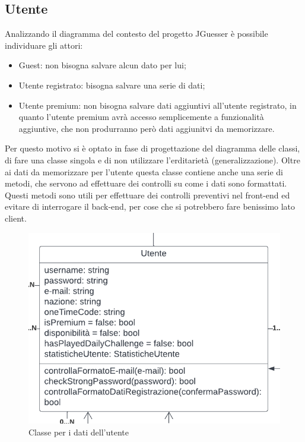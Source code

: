\subsection{Utente}
Analizzando il diagramma del contesto del progetto JGuesser è possibile individuare gli attori: 
\begin{itemize}
    \item Guest: non bisogna salvare alcun dato per lui;
    \item Utente registrato: bisogna salvare una serie di dati;
    \item Utente premium: non bisogna salvare dati aggiuntivi all'utente registrato, in quanto l'utente premium avrà accesso semplicemente a funzionalità aggiuntive, che non produrranno però dati aggiunitvi da memorizzare.
\end{itemize} 
Per questo motivo si è optato in fase di progettazione del diagramma delle classi, di fare una classe singola e di non utilizzare l'erditarietà (generalizzazione). Oltre ai dati da memorizzare per l'utente questa classe contiene anche una serie di metodi, che servono ad effettuare dei controlli su come i dati sono formattati. Questi metodi sono utili per effettuare dei controlli preventivi nel front-end ed evitare di interrogare il back-end, per cose che si potrebbero fare benissimo lato client.

\begin{figure}[!h]
\centering
\includegraphics[scale=0.35]{images/classe_utente.png}
\caption{Classe per i dati dell'utente}
\label{fig:classe_utente}
\end{figure}
\noindent

